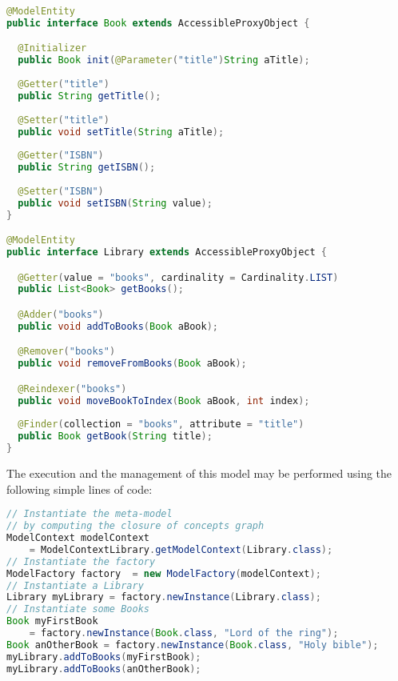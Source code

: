 \begin{lstlisting}[language=Java,basicstyle=\ttfamily\footnotesize, caption=Model creation, label=lst:model]
@ModelEntity
public interface Book extends AccessibleProxyObject {

  @Initializer
  public Book init(@Parameter("title")String aTitle);
  
  @Getter("title")
  public String getTitle();
  
  @Setter("title")
  public void setTitle(String aTitle);
  
  @Getter("ISBN")
  public String getISBN();
  
  @Setter("ISBN")
  public void setISBN(String value);
}

@ModelEntity
public interface Library extends AccessibleProxyObject {

  @Getter(value = "books", cardinality = Cardinality.LIST)
  public List<Book> getBooks();

  @Adder("books")
  public void addToBooks(Book aBook);

  @Remover("books")
  public void removeFromBooks(Book aBook);

  @Reindexer("books")
  public void moveBookToIndex(Book aBook, int index);
  
  @Finder(collection = "books", attribute = "title")
  public Book getBook(String title);
}
\end{lstlisting}

The execution and the management of this model may be performed using the following simple lines of code:

\begin{lstlisting}[language=Java,basicstyle=\ttfamily\footnotesize, caption=model execution/manipulation, label=lst:execution]
// Instantiate the meta-model
// by computing the closure of concepts graph
ModelContext modelContext 
    = ModelContextLibrary.getModelContext(Library.class);
// Instantiate the factory
ModelFactory factory  = new ModelFactory(modelContext);
// Instantiate a Library
Library myLibrary = factory.newInstance(Library.class);
// Instantiate some Books
Book myFirstBook 
    = factory.newInstance(Book.class, "Lord of the ring");
Book anOtherBook = factory.newInstance(Book.class, "Holy bible");
myLibrary.addToBooks(myFirstBook);
myLibrary.addToBooks(anOtherBook);
\end{lstlisting}

